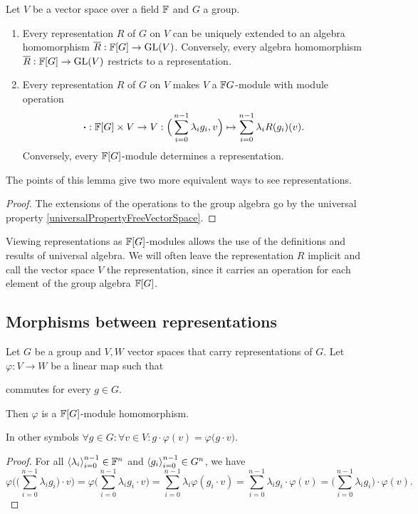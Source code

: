 \begin{lemma} \label{representationEquivalents}
Let $V$ be a vector space over a field $\mathbb{F}$ and $G$ a group.
\begin{enumerate}
\item Every representation $R$ of $G$ on $V$ can be uniquely extended to an algebra homomorphism $\overline{R}: \mathbb{F}[G]\to \operatorname{GL}(V)$. Conversely, every algebra homomorphism $\overline{R}: \mathbb{F}[G]\to \operatorname{GL}(V)$ restricts to a representation.
\item Every representation $R$ of $G$ on $V$ makes $V$ a $\mathbb{F} G$-module with module operation
\[ \boldsymbol{\cdot}: \mathbb{F}[G]\times V\to V: \Big(\sum_{i=0}^{n-1}\lambda_ig_i, v\Big) \mapsto \sum_{i=0}^{n-1}\lambda_iR(g_i)(v).  \]
Conversely, every $\mathbb{F}[G]$-module determines a representation.
\end{enumerate}
\end{lemma}
The points of this lemma give two more equivalent ways to see representations.
\begin{proof}
The extensions of the operations to the group algebra go by the universal property \ref{universalPropertyFreeVectorSpace}.
\end{proof}

Viewing representations as $\mathbb{F}[G]$-modules allows the use of the definitions and results of universal algebra. We will often leave the representation $R$ implicit and call the vector space $V$ the representation, since it carries an operation for each element of the group algebra $\mathbb{F}[G]$.

\subsection{Morphisms between representations}

\begin{lemma}
Let $G$ be a group and $V,W$ vector spaces that carry representations of $G$. Let $\varphi: V\to W$ be a linear map such that
\begin{center}
commutes for every $g\in G$.
\end{center}
Then $\varphi$ is a $\mathbb{F}[G]$-module homomorphism.
\end{lemma}
In other symbols $\forall g\in G: \forall v\in V: g\cdot \varphi(v) = \varphi\big(g\cdot v\big)$.
\begin{proof}
For all $\left\langle \lambda_i \right\rangle_{i=0}^{n-1}\in \mathbb{F}^n$ and $\left\langle g_i \right\rangle_{i=0}^{n-1}\in G^n$, we have
\[ \varphi\bigg(\Big(\sum_{i=0}^{n-1}\lambda_i g_i\Big)\cdot v\bigg)  = \varphi\Big(\sum_{i=0}^{n-1}\lambda_i g_i\cdot v\Big) = \sum_{i=0}^{n-1}\lambda_i\varphi(g_i\cdot v) = \sum_{i=0}^{n-1}\lambda_i g_i\cdot \varphi(v) = \Big(\sum_{i=0}^{n-1}\lambda_i g_i\Big)\cdot \varphi(v). \]
\end{proof}

